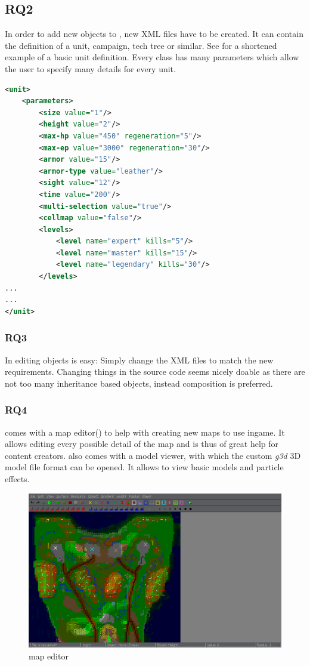 \subsection{RQ2}
In order to add new objects to \GLEST{}, new XML files have to be created. It can contain the definition of a unit, campaign,
tech tree or similar. See  for a shortened example of a basic unit definition. Every class has many
parameters which allow the user to specify many details for every unit. 

\begin{lstlisting}[language=XML,caption=A basic \GLEST{} (shortened) unit definition in XML, label=glestxml]
<unit>
	<parameters>
		<size value="1"/>
		<height value="2"/>
		<max-hp value="450" regeneration="5"/>
		<max-ep value="3000" regeneration="30"/>
		<armor value="15"/>	
		<armor-type value="leather"/>
		<sight value="12"/>
		<time value="200"/>	
		<multi-selection value="true"/>	
		<cellmap value="false"/>
		<levels>
			<level name="expert" kills="5"/>
			<level name="master" kills="15"/>
			<level name="legendary" kills="30"/>
		</levels>
...
...
</unit>
\end{lstlisting}

\subsubsection{RQ3}
In \GLEST{} editing objects is easy: Simply change the XML files to match the new requirements. Changing things in the
source code seems nicely doable as there are not too many inheritance based objects, instead composition is preferred.

\subsubsection{RQ4}
\GLEST{} comes with a map editor() to help with creating new maps to use ingame. It allows editing every possible detail
of the map and is thus of great help for content creators. \GLEST{} also comes with a model viewer, with which the
custom \textit{g3d} 3D model file format can be opened. It allows to view basic models and particle effects.

\begin{figure}[h!]
    \centering
    \includegraphics[width=\textwidth]{pics/glesteditor}
    \caption{\GLEST{} map editor}
    \label{fig:glestmapeditor}
\end{figure}

